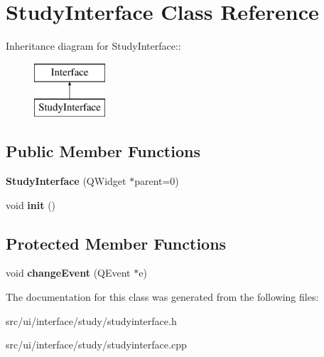 \hypertarget{classStudyInterface}{
\section{StudyInterface Class Reference}
\label{classStudyInterface}
}
Inheritance diagram for StudyInterface::\begin{figure}[H]
\begin{center}
\leavevmode
\includegraphics[height=2cm]{classStudyInterface}
\end{center}
\end{figure}
\subsection*{Public Member Functions}
\begin{DoxyCompactItemize}
\item 
\hypertarget{classStudyInterface_ad4013c829e21c5b1e559508232cd3292}{
{\bfseries StudyInterface} (QWidget $\ast$parent=0)}
\label{classStudyInterface_ad4013c829e21c5b1e559508232cd3292}

\item 
\hypertarget{classStudyInterface_ac7c876ab6cbe2a419070d6c9f321d941}{
void {\bfseries init} ()}
\label{classStudyInterface_ac7c876ab6cbe2a419070d6c9f321d941}

\end{DoxyCompactItemize}
\subsection*{Protected Member Functions}
\begin{DoxyCompactItemize}
\item 
\hypertarget{classStudyInterface_a6c21090fbc9d7d116b7cac407bf15ee4}{
void {\bfseries changeEvent} (QEvent $\ast$e)}
\label{classStudyInterface_a6c21090fbc9d7d116b7cac407bf15ee4}

\end{DoxyCompactItemize}


The documentation for this class was generated from the following files:\begin{DoxyCompactItemize}
\item 
src/ui/interface/study/studyinterface.h\item 
src/ui/interface/study/studyinterface.cpp\end{DoxyCompactItemize}
